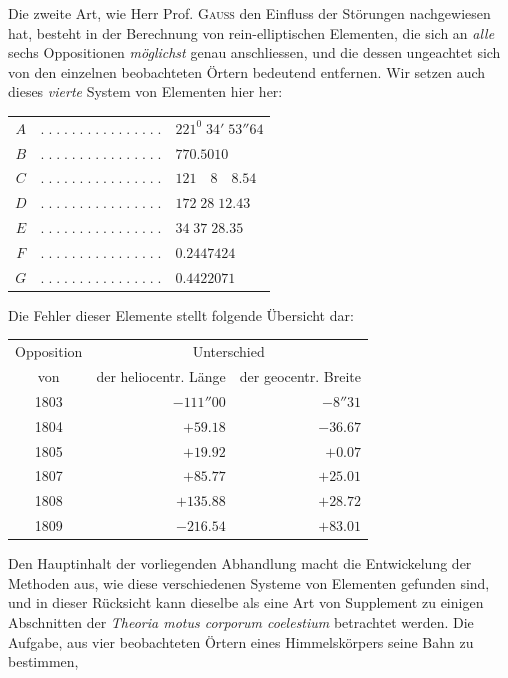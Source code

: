 %
Die zweite Art, wie Herr Prof. \textsc{Gauss} den Einfluss der Störungen nachgewiesen
hat, besteht in der Berechnung von rein-elliptischen Elementen, die sich
an \textit{alle} sechs Oppositionen \textit{möglichst} genau anschliessen, und die dessen ungeachtet
sich von den einzelnen beobachteten Örtern bedeutend entfernen. Wir setzen
auch dieses \textit{vierte} System von Elementen hier her:
\begin{center}
\begin{tabular}{cll}
$A$ & $.\;.\;.\;.\;.\;.\;.\;.\;.\;.\;.\;.\;.\;.\;.\;.$ & $221^0\;34'\;53''64$\\
$B$ & $.\;.\;.\;.\;.\;.\;.\;.\;.\;.\;.\;.\;.\;.\;.\;.$ & $770.5010$\\
$C$ & $.\;.\;.\;.\;.\;.\;.\;.\;.\;.\;.\;.\;.\;.\;.\;.$ & $121\quad8\quad8.54$\\
$D$ & $.\;.\;.\;.\;.\;.\;.\;.\;.\;.\;.\;.\;.\;.\;.\;.$ & $172\;28\;12.43$\\
$E$ & $.\;.\;.\;.\;.\;.\;.\;.\;.\;.\;.\;.\;.\;.\;.\;.$ & $34\;37\;28.35$\\
$F$ & $.\;.\;.\;.\;.\;.\;.\;.\;.\;.\;.\;.\;.\;.\;.\;.$ & $0.2447424$\\
$G$ & $.\;.\;.\;.\;.\;.\;.\;.\;.\;.\;.\;.\;.\;.\;.\;.$ & $0.4422071$
\end{tabular}
\end{center}
Die Fehler dieser Elemente stellt folgende Übersicht dar:
\begin{center}\small
\setlength{\tabcolsep}{4pt}
\begin{tabular}{c|r|r}
Opposition & \multicolumn{2}{c}{Unterschied}\\
von & der heliocentr. Länge & der geocentr. Breite\\\hline
1803 & $-111''00$ & $-8''31$\\
1804 & $+59.18$ & $-36.67$\\
1805 & $+19.92$ & $+0.07$\\
1807 & $+85.77$ & $+25.01$\\
1808 & $+135.88$ & $+28.72$\\
1809 & $-216.54$ & $+83.01$
\end{tabular}\end{center}
Den Hauptinhalt der vorliegenden Abhandlung macht die Entwickelung der
Methoden aus, wie diese verschiedenen Systeme von Elementen gefunden sind,
und in dieser Rücksicht kann dieselbe als eine Art von Supplement zu einigen
Abschnitten der \textit{Theoria motus corporum coelestium} betrachtet werden. Die Aufgabe,
aus vier beobachteten Örtern eines Himmelskörpers seine Bahn zu bestimmen,
